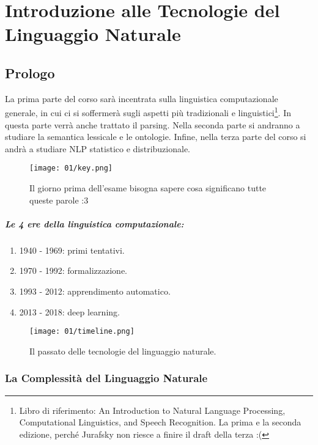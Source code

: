 \chapter{Introduzione alle Tecnologie del Linguaggio Naturale}

\section{Prologo}

La prima parte del corso sarà incentrata sulla linguistica computazionale generale, in cui ci si soffermerà sugli aspetti più tradizionali e linguistici\footnote{Libro di riferimento: An Introduction to Natural Language Processing,
Computational Linguistics, and Speech Recognition. La prima e la seconda edizione, perché Jurafsky non riesce a finire il draft della terza :(}. In questa parte verrà anche trattato il parsing. Nella seconda parte si andranno a studiare la semantica lessicale e le ontologie. Infine, nella terza parte del corso si andrà a studiare NLP statistico e distribuzionale.

\begin{figure}[h]
    \centering
    \texttt{[image: 01/key.png]}
    \caption{Il giorno prima dell'esame bisogna sapere cosa significano tutte queste parole :3}
\end{figure}

\paragraph{Le 4 ere della linguistica computazionale:}

\begin{enumerate}
  \item 1940 - 1969: primi tentativi. 
  \item 1970 - 1992: formalizzazione. 
  \item 1993 - 2012: apprendimento automatico. 
  \item 2013 - 2018: deep learning.
\end{enumerate}


\begin{figure}[h]
    \centering
    \texttt{[image: 01/timeline.png]}
    \caption{Il passato delle tecnologie del linguaggio naturale.}
\end{figure}

\subsection{La Complessità del Linguaggio Naturale}

